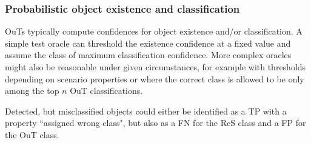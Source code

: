 \documentclass[conference]{IEEEtran}
\begin{document}
\subsubsection{Probabilistic object existence and classification}
\label{sec:prob_thresholding}


OuTs typically compute confidences for object existence and/or classification.
A simple test oracle can threshold the existence confidence at a fixed value and assume the class of maximum classification confidence.
More complex oracles might also be reasonable under given circumstances, for example with thresholds depending on scenario properties or where the correct class is allowed to be only among the top $n$ OuT classifications. 

Detected, but misclassified objects could either be identified as a TP with a property ``assigned wrong class", but also as a FN for the ReS class and a FP for the OuT class.




\end{document}
